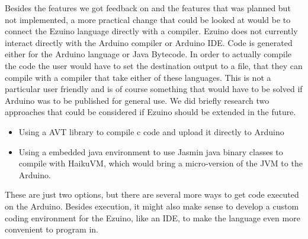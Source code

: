 Besides the features we got feedback on and the features that was planned but not implemented, a more practical change that could be looked at would be to connect the Ezuino language directly with a compiler. Ezuino does not currently interact directly with the Arduino compiler or Arduino IDE. Code is generated either for the Arduino language or Java Bytecode. In order to actually compile the code the user would have to set the destination output to a file, that they can compile with a compiler that take either of these languages. This is not a particular user friendly and is of course something that would have to be solved if Arduino was to be published for general use. We did briefly research two approaches that could be considered if Ezuino should be extended in the future.
\begin{itemize}
    \item Using a AVT library to compile c code and upload it directly to Arduino
    \item Using a embedded java environment to use Jasmin java binary classes to compile with HaikuVM\cite{haiku}, which would bring a micro-version of the JVM to the Arduino.
\end{itemize}
These are just two options, but there are several more ways to get code executed on the Arduino. Besides execution, it might also make sense to develop a custom coding environment for the Ezuino, like an IDE, to make the language even more convenient to program in. 



